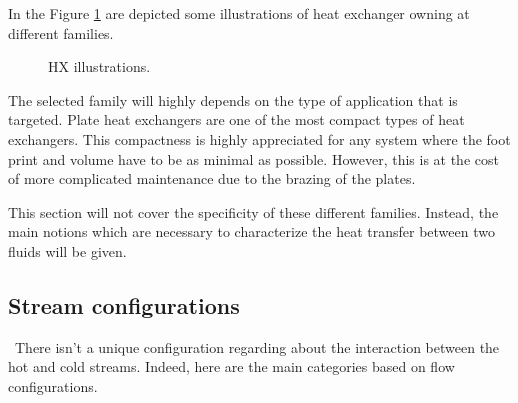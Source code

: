 In the Figure \ref{fig:C4_HX} are depicted some illustrations of heat exchanger owning at different families.
\begin{figure}[h]
    \centering
    \hfill
    \hfill
    \caption{HX illustrations.} \label{fig:C4_HX}
\end{figure}

The selected family will highly depends on the type of application that is targeted. Plate heat exchangers are one of the most compact types of heat exchangers. This compactness is highly appreciated for any system where the foot print and volume have to be as minimal as possible. However, this is at the cost of more complicated maintenance due to the brazing of the plates.

This section will not cover the specificity of these different families. Instead, the main notions which are necessary to characterize the heat transfer between two fluids will be given.

\subsection{Stream configurations}
\quad\ There isn't a unique configuration regarding about the interaction between the hot and cold streams. Indeed, here are the main categories based on flow configurations.

